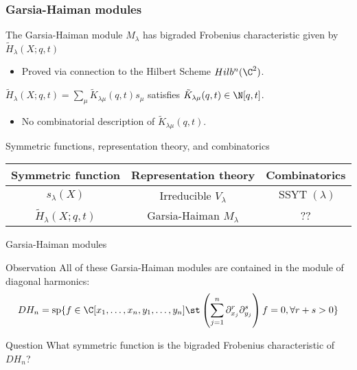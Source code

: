 \documentclass[dvipsnames]{beamer}
\newcommand{\Htild}{\tilde{H}}
\renewcommand{\Span}{\operatorname{sp}}
\DeclareMathOperator{\SSYT}{SSYT}
\theoremstyle{definition}
\newcounter{c}
\begin{document}
\begin{frame}
  \frametitle{Garsia-Haiman modules}
  \begin{theorem}[Haiman, 2001]
    The Garsia-Haiman module \(M_\lambda\) has bigraded Frobenius
    characteristic given by \(\tilde{H}_\lambda(X;q,t)\)
  \end{theorem}\pause
  \begin{itemize}
  \item Proved via connection to the Hilbert Scheme \(Hilb^n(\C^2)\).\pause
  \end{itemize}
  \begin{corollary}
    \(\tilde{H}_\lambda(X;q,t) = \sum_\mu \tilde{K}_{\lambda \mu}(q,t) s_\mu\)
    satisfies \(\tilde{K}_{\lambda \mu}(q,t) \in \N[q,t]\).
  \end{corollary}\pause
  \begin{itemize}
  \item No combinatorial description of \(\tilde{K}_{\lambda \mu}(q,t)\).
  \end{itemize}
  \end{frame}
  \begin{frame}{Symmetric functions, representation theory, and combinatorics}
    \begin{tabular}{ccc}
      Symmetric function & Representation theory & Combinatorics 
      \\
      \hline
      \(s_\lambda(X)\) & Irreducible \(V_\lambda\) & \(\SSYT(\lambda)\) \\
      \(\Htild_\lambda(X;q,t)\) & Garsia-Haiman \(M_\lambda\) & ??
    \end{tabular}
  \end{frame}
  \begin{frame}{Garsia-Haiman modules}
  \begin{block}{Observation}
    All of these Garsia-Haiman modules are contained in the module of
    diagonal harmonics:  \[
      DH_n = \Span\{ f \in \C[x_1,\ldots,x_n,y_1,\ldots,y_n] \st
      \left(\sum_{j=1}^n \partial_{x_j}^r \partial_{y_j}^s\right) f = 0, \forall r+s>0\}
    \]
  \end{block}\pause
  \begin{block}{Question}
    What symmetric function is the bigraded Frobenius characteristic
    of \(DH_n\)?
  \end{block}
\end{frame}
\end{document}
